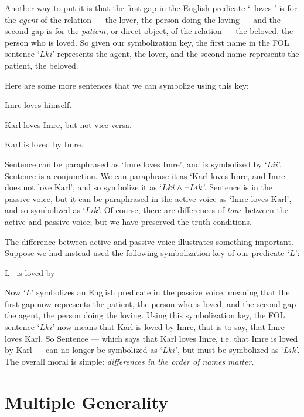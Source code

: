 Another way to put it is that the first gap in the English predicate   `\blank\ loves \blank' is for the \emph{agent} of the relation --- the lover, the person doing the loving --- and the second gap is for the \emph{patient}, or direct object, of the relation --- the beloved, the person who is loved.  So given our symbolization key, the first name in the FOL sentence `$Lki$' represents the agent, the lover, and the second name represents the patient, the beloved.



Here are some more sentences that we can symbolize using this key:
\begin{earg}
	\item[\ex{terms4}] Imre loves himself.
	\item[\ex{terms5}] Karl loves Imre, but not vice versa.
	\item[\ex{terms6}] Karl is loved by Imre.
\end{earg}
Sentence  can be paraphrased as `Imre loves Imre', and is symbolized by `$Lii$'. Sentence  is a conjunction. We can paraphrase it as `Karl loves Imre, and Imre does not love Karl', and so symbolize it as `$Lki \wedge \neg Lik$'. Sentence  is in the passive voice, but it can be paraphrased in the active voice as `Imre loves Karl', and so symbolized as `$Lik$'. Of course, there are differences of \emph{tone} between the active and passive voice; but we have preserved the truth conditions.


The difference between active and passive voice illustrates something important.  Suppose we had instead used the following symbolization key of our predicate `$L$':
	\begin{ekey}
		\item[L] \blank\ is loved by \blank
	\end{ekey}
Now `$L$'  symbolizes an English predicate in the passive voice, meaning that the first gap now represents the patient, the person who is loved, and the second gap the agent, the person doing the loving.  Using this symbolization key, the FOL sentence `$Lki$' now means that Karl is loved by Imre, that is to say, that Imre loves Karl.  So Sentence  --- which says that Karl loves Imre, i.e. that Imre is loved by Karl --- can no longer be symbolized as `$Lki$', but must be symbolized as `$Lik$'.  The overall moral is simple: \emph{differences in the order of names matter.}




\section{Multiple Generality}

